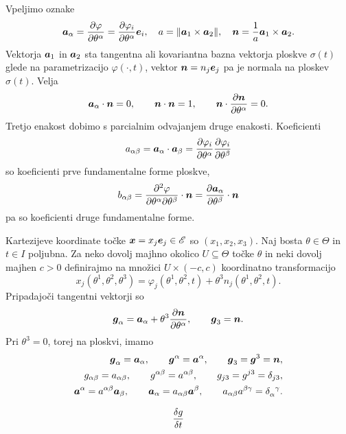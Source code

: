 Vpeljimo oznake
\[
	\boldsymbol a_{\alpha}=\frac{\partial\varphi}{\partial\theta^{\alpha}}
	=\frac{\partial\varphi_i}{\partial\theta^{\alpha}}\boldsymbol e_i,\quad
	a=\|\boldsymbol a_1\times\boldsymbol a_2\|,\quad
	\boldsymbol n=\frac{1}{a}\boldsymbol a_1\times\boldsymbol a_2.
\]
Vektorja $\boldsymbol a_1$ in $\boldsymbol a_2$ sta tangentna ali kovariantna bazna vektorja ploskve $\sigma(t)$
glede na parametrizacijo $\varphi(\cdot,t)$, vektor
$\boldsymbol n=n_j\boldsymbol e_j$ pa je normala na ploskev $\sigma(t)$. Velja
\[ \boldsymbol a_{\alpha}\cdot\boldsymbol n=0,\qquad \boldsymbol n\cdot\boldsymbol n=1,\qquad \boldsymbol n\cdot\frac{\partial\boldsymbol n}{\partial\theta^{\alpha}}=0. \]
Tretjo enakost dobimo s parcialnim odvajanjem druge enakosti. Koeficienti
\[
	a_{\alpha\beta}=\boldsymbol a_{\alpha}\cdot\boldsymbol a_{\beta}=
	\frac{\partial\varphi_i}{\partial\theta^{\alpha}}\frac{\partial\varphi_i}{\partial \theta^{\beta}}
\]
so koeficienti prve fundamentalne forme ploskve,
\[
	b_{\alpha\beta}=\frac{\partial^2\varphi}{\partial\theta^{\alpha}\partial\theta^{\beta}}
	\cdot\boldsymbol n=\frac{\partial\boldsymbol a_{\alpha}}{\partial\theta^{\beta}}\cdot\boldsymbol n
\]
pa so koeficienti druge fundamentalne forme.

Kartezijeve koordinate točke $\boldsymbol x=x_j\boldsymbol e_j\in\mathscr E$ so $(x_1,x_2,x_3)$. Naj bosta $\theta\in\Theta$
in $t\in I$ poljubna. Za neko dovolj majhno okolico $U\subseteq\Theta$ točke $\theta$ in neki dovolj
majhen $c>0$ definirajmo na množici $U\times(-c,c)$ koordinatno transformacijo
\[
	x_j(\theta^1,\theta^2,\theta^3)=\varphi_j(\theta^1,\theta^2,t)+\theta^3 n_j(\theta^1,\theta^2,t).
\]
Pripadajoči tangentni vektorji so
\[ \boldsymbol g_{\alpha}=\boldsymbol a_{\alpha}+\theta^3\frac{\partial\boldsymbol n}{\partial\theta^{\alpha}},\qquad \boldsymbol g_3=\boldsymbol n. \]
Pri $\theta^3=0$, torej na ploskvi, imamo
\begin{align*}
	\vek{g}_{\alpha}=\vek{a}_{\alpha},\qquad \vek{g}^{\alpha}=\vek{a}^{\alpha},\qquad \vek{g}_3=\vek{g}^3=\vek{n}, \\
	g_{\alpha\beta}=a_{\alpha\beta},\qquad g^{\alpha\beta}=a^{\alpha\beta},\qquad g_{j 3}=g^{j 3}=\delta_{j 3}, \\
	\vek{a}^{\alpha}=a^{\alpha\beta}\vek{a}_{\beta},\qquad \vek{a}_{\alpha}=a_{\alpha\beta}\vek{a}^{\beta},
	\qquad a_{\alpha\beta}a^{\beta\gamma}=\bottop{\delta}{\alpha}{\gamma}.
\end{align*}

\[\frac{\delta g}{\delta t}\]